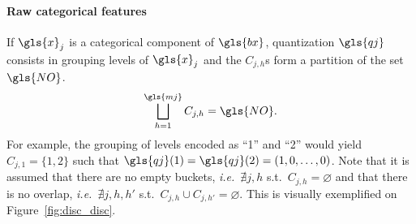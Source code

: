 \paragraph{Raw categorical features} If $\gls{x}_j$ is a categorical component of $\gls{bx}$, quantization $\gls{qj}$ consists in grouping levels of $\gls{x}_j$ and the $C_{j,h}$s form a partition of the set $\gls{NO}$.
\begin{equation*}
\bigsqcup_{h=1}^{\gls{mj}}C_{j,h}=\gls{NO}.
\end{equation*}
For example, the grouping of levels encoded as ``1'' and ``2'' would yield $C_{j,1} = \{1,2\}$ such that $\gls{qj}(1) = \gls{qj}(2) = (1,0,\ldots,0)$. Note that it is assumed that there are no empty buckets, \textit{i.e.}\ $\nexists j, h$ s.t.\ $C_{j,h} = \varnothing$ and that there is no overlap, \textit{i.e.}\ $\nexists j,h,h'$ s.t.\ $C_{j,h} \cup C_{j,h'} = \varnothing$. This is visually exemplified on Figure~\ref{fig:disc_disc}.


